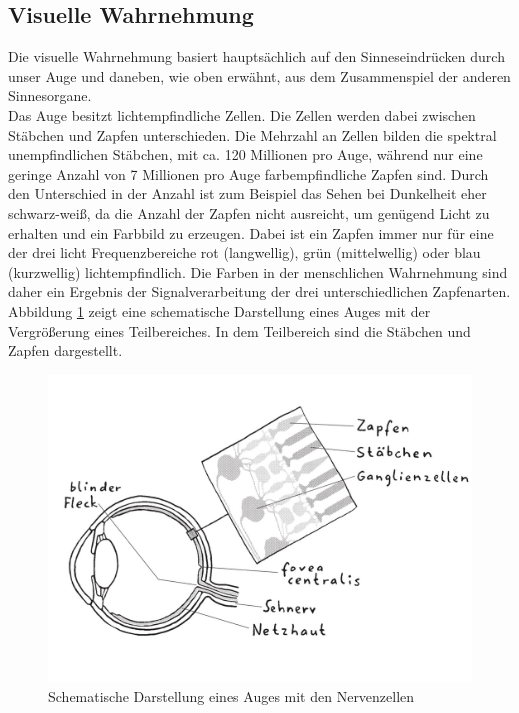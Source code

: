 \subsection{Visuelle Wahrnehmung}
Die visuelle Wahrnehmung basiert hauptsächlich auf den Sinneseindrücken durch unser Auge und daneben, wie oben erwähnt, aus dem Zusammenspiel der anderen Sinnesorgane. \\
Das Auge besitzt lichtempfindliche Zellen. Die Zellen werden dabei zwischen Stäbchen und Zapfen unterschieden. Die Mehrzahl an Zellen bilden die spektral unempfindlichen Stäbchen, mit ca. 120 Millionen pro Auge, während nur eine geringe Anzahl von 7 Millionen pro Auge farbempfindliche Zapfen sind. Durch den Unterschied in der Anzahl ist zum Beispiel das Sehen bei Dunkelheit eher schwarz-weiß, da die Anzahl der Zapfen nicht ausreicht, um genügend Licht zu erhalten und ein Farbbild zu erzeugen. Dabei ist ein Zapfen immer nur für eine der drei licht Frequenzbereiche rot (langwellig), grün (mittelwellig) oder blau (kurzwellig) lichtempfindlich. Die Farben in der menschlichen Wahrnehmung sind daher ein Ergebnis der Signalverarbeitung der drei unterschiedlichen Zapfenarten. \cite[Vgl. Seite 14]{Buhler.2017}\\
Abbildung \ref{fig:Auge} zeigt eine schematische Darstellung eines Auges mit der Vergrößerung eines Teilbereiches. In dem Teilbereich sind die Stäbchen und Zapfen dargestellt. \\
\begin{figure}[hbt]
	\centering
	\includegraphics[width=0.5\linewidth]{images/Auge}
	\caption[Schematische Darstellung eines Auges mit den Nervenzellen]{Schematische Darstellung eines Auges mit den Nervenzellen \cite[Seite 141]{Schonhammer.2013}}
	\label{fig:Auge}
\end{figure}

